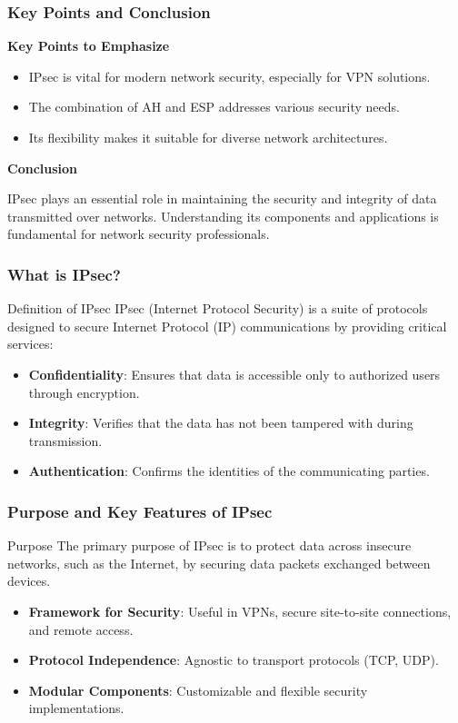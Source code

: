 \documentclass{beamer}
\begin{document}
\begin{frame}[fragile]
    \frametitle{Key Points and Conclusion}
    
    \textbf{Key Points to Emphasize}
    \begin{itemize}
        \item IPsec is vital for modern network security, especially for VPN solutions.
        \item The combination of AH and ESP addresses various security needs.
        \item Its flexibility makes it suitable for diverse network architectures.
    \end{itemize}
    
    \textbf{Conclusion}
    \begin{block}{}
        IPsec plays an essential role in maintaining the security and integrity of data transmitted over networks.
        Understanding its components and applications is fundamental for network security professionals.
    \end{block}
\end{frame}

\begin{frame}[fragile]
    \frametitle{What is IPsec?}
    \begin{block}{Definition of IPsec}
        IPsec (Internet Protocol Security) is a suite of protocols designed to secure Internet Protocol (IP) communications by providing critical services:
    \end{block}
    \begin{itemize}
        \item \textbf{Confidentiality}: Ensures that data is accessible only to authorized users through encryption.
        \item \textbf{Integrity}: Verifies that the data has not been tampered with during transmission.
        \item \textbf{Authentication}: Confirms the identities of the communicating parties.
    \end{itemize}
\end{frame}

\begin{frame}[fragile]
    \frametitle{Purpose and Key Features of IPsec}
    \begin{block}{Purpose}
        The primary purpose of IPsec is to protect data across insecure networks, such as the Internet, by securing data packets exchanged between devices.
    \end{block}
    
    \begin{itemize}
        \item \textbf{Framework for Security}: Useful in VPNs, secure site-to-site connections, and remote access.
        \item \textbf{Protocol Independence}: Agnostic to transport protocols (TCP, UDP).
        \item \textbf{Modular Components}: Customizable and flexible security implementations.
    \end{itemize}
\end{frame}
\end{document}
